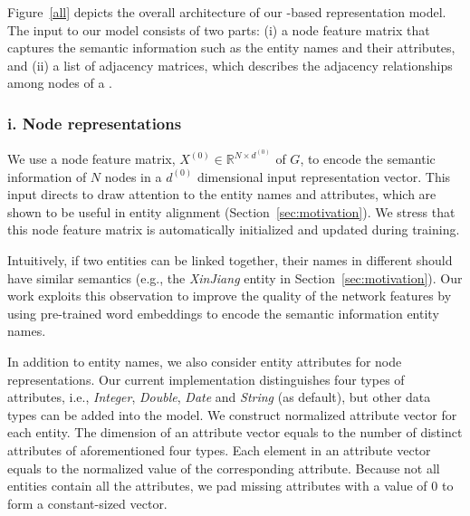     Figure~\ref{all} depicts the overall architecture of our \RGCN-based \KG representation model. 	
  	The input to our model consists of two parts: (i) a node feature matrix that captures the semantic information such as the entity
  names and their attributes, and (ii) a list of adjacency matrices, which describes the adjacency relationships among nodes of a \KG.

%

\subsubsection{i. Node representations}
	\label{subsection:Node Representations}
   We use a node feature matrix, $X^{(0)} \in \mathbb{R}^{N \times d^{(0)}}$ of $G$, to encode the semantic information of $N$  nodes in a $d^{(0)}$ dimensional input representation vector.
   This input directs \RGCN to draw attention to the entity names and attributes, which are shown to be useful in entity
   alignment (Section~\ref{sec:motivation}). We stress that this node feature matrix is automatically initialized and updated during training.

	
	\label{wordvector}
	Intuitively, if two entities can be linked together, their names in different \KGs should have similar semantics (e.g., the \emph{XinJiang} entity in Section~\ref{sec:motivation}).
    Our work exploits this observation to improve the quality of the network features by using pre-trained word embeddings to encode the semantic
    information entity names.

	
    In addition to entity names, we also consider entity attributes for node representations.
	Our current implementation distinguishes four types of attributes, i.e., \emph{Integer}, \emph{Double}, \emph{Date} and \emph{String}
(as default), but other data types can be added into the model.
%	
	We construct normalized attribute vector for each entity. The dimension of an attribute vector equals to the number of distinct attributes of aforementioned four types.
	Each element in an attribute vector equals to the normalized value of the corresponding attribute.
    Because not all entities contain all the attributes, we pad missing attributes with a value of 0 to form a constant-sized vector.

